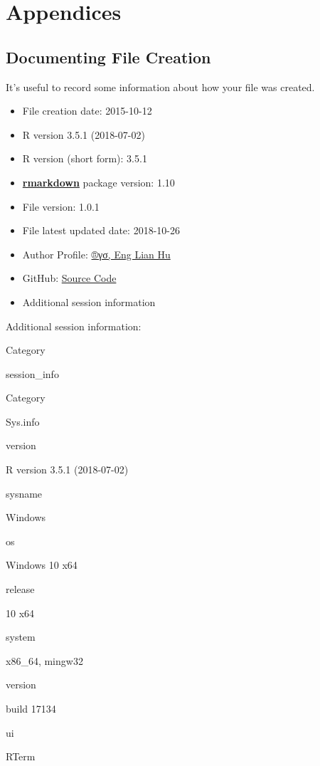\documentclass[]{article}
\providecommand{\tightlist}{%
  \setlength{\itemsep}{0pt}\setlength{\parskip}{0pt}}
\begin{document}
\section{Appendices}\label{appendices}

\subsection{Documenting File Creation}\label{documenting-file-creation}

It's useful to record some information about how your file was created.

\begin{itemize}
\tightlist
\item
  File creation date: 2015-10-12
\item
  R version 3.5.1 (2018-07-02)
\item
  R version (short form): 3.5.1
\item
  \href{https://github.com/rstudio/rmarkdown}{\textbf{rmarkdown}}
  package version: 1.10
\item
  File version: 1.0.1
\item
  File latest updated date: 2018-10-26
\item
  Author Profile:
  \href{https://beta.rstudioconnect.com/content/3091/ryo-eng.html}{®γσ,
  Eng Lian Hu}
\item
  GitHub: \href{https://github.com/scibrokes/owner}{Source Code}
\item
  Additional session information
\end{itemize}

Additional session information:

Category

session\_info

Category

Sys.info

version

R version 3.5.1 (2018-07-02)

sysname

Windows

os

Windows 10 x64

release

10 x64

system

x86\_64, mingw32

version

build 17134

ui

RTerm
\end{document}
